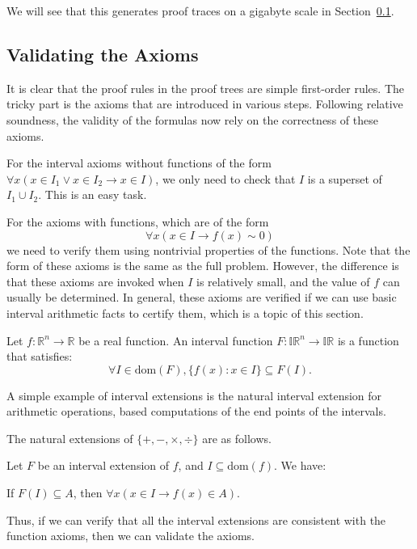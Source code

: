 \documentclass[envcountsect]{llncs}
\newcommand{\dom}{\mathrm{dom}}
\begin{document}
We will see that this generates proof traces on a gigabyte scale in
Section~\ref{}. 


\subsection{Validating the Axioms}

It is clear that the proof rules in the proof trees are simple first-order
rules. The tricky part is the axioms that are introduced in various
steps. Following relative soundness, the validity of the formulas now rely on the
correctness of these axioms.

For the interval axioms without functions of the form $\forall x(x\in I_1\vee
x\in I_2\rightarrow x\in I)$, we only need to check that $I$ is a superset of
$I_1\cup I_2$. This is an easy task.

For the axioms with functions, which are of the form
$$\forall x (x\in I \rightarrow f(x)\sim 0)$$
we need to verify them using nontrivial properties of the functions. Note that
the form of these axioms is the same as the full problem. However, the
difference is that these axioms are invoked when $I$ is relatively small, and
the value of $f$ can usually be determined. In general, these axioms are
verified if we can use basic interval arithmetic facts to certify them, which is
a topic of this section.

\begin{definition}
Let $f: \mathbb{R}^n\rightarrow \mathbb{R}$ be a real function. An interval
function $F: \mathbb{IR}^n \rightarrow \mathbb{IR}$ is a function that
satisfies:
$$\forall I\in \dom(F), \{f(x): x\in I\}\subseteq F(I).$$
\end{definition}

A simple example of interval extensions is the natural interval extension for
arithmetic operations, based computations of the end points of the intervals.
\begin{example}
The natural extensions of $\{+, -, \times, \div\}$ are as follows.
\end{example}

\begin{proposition}
Let $F$ be an interval extension of $f$, and $I\subseteq \dom(f)$. We have:
\begin{center}
If $F(I)\subseteq A$, then $\forall x (x\in I \rightarrow f(x)\in A)$.
\end{center}
\end{proposition}
Thus, if we can verify that all the interval extensions are consistent with the
function axioms, then we can validate the axioms.
\end{document}

